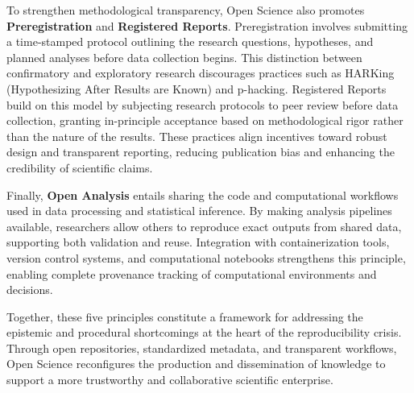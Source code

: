 To strengthen methodological transparency, Open Science also promotes \textbf{Preregistration} and \textbf{Registered Reports}. Preregistration involves submitting a time-stamped protocol outlining the research questions, hypotheses, and planned analyses before data collection begins. This distinction between confirmatory and exploratory research discourages practices such as HARKing (Hypothesizing After Results are Known) and p-hacking. Registered Reports build on this model by subjecting research protocols to peer review before data collection, granting in-principle acceptance based on methodological rigor rather than the nature of the results. These practices align incentives toward robust design and transparent reporting, reducing publication bias and enhancing the credibility of scientific claims.

Finally, \textbf{Open Analysis} entails sharing the code and computational workflows used in data processing and statistical inference. By making analysis pipelines available, researchers allow others to reproduce exact outputs from shared data, supporting both validation and reuse. Integration with containerization tools, version control systems, and computational notebooks strengthens this principle, enabling complete provenance tracking of computational environments and decisions.

Together, these five principles constitute a framework for addressing the epistemic and procedural shortcomings at the heart of the reproducibility crisis. Through open repositories, standardized metadata, and transparent workflows, Open Science reconfigures the production and dissemination of knowledge to support a more trustworthy and collaborative scientific enterprise.
